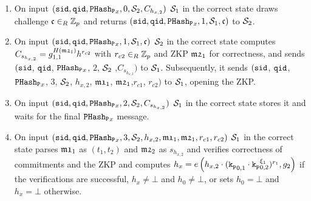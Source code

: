 \begin{enumerate}
    
	    \item On input $(\mathtt{sid},\mathtt{qid},\mathtt{PHash_P}_x,0,\mathcal{S}_2,C_{h_{x,2}})$ $\mathcal{S}_1$ in the correct state draws challenge $\mathfrak{c}\in_R\mathbb{Z}_p$ and returns $(\mathtt{sid},\mathtt{qid},\mathtt{PHash_P}_x,1,\mathcal{S}_1,\mathfrak{c})$ to $\mathcal{S}_2$.
	    
	    \item On input $(\mathtt{sid},\mathtt{qid},\mathtt{PHash_P}_x,1,\mathcal{S}_1,\mathfrak{c})$ $\mathcal{S}_2$ in the correct state computes
	    $C_{s_{h_{x,2}}}=g_{1,1}^{H(\mathfrak{m2}_{1})} h^{r_{c2}}$ with $r_{c2}\in_R\mathbb{Z}_p$ and \ac{ZKP} $\mathfrak{m2}_1$ for correctness,
	    and sends $(\mathtt{sid}$, $\mathtt{qid}$, $\mathtt{PHash_P}_x$, $2$, $\mathcal{S}_2$ ,$C_{s_{h_{x,2}}})$ to $\mathcal{S}_1$.
	    Subsequently, it sends $(\mathtt{sid}$, $\mathtt{qid}$, $\mathtt{PHash_P}_x$, $3$, $\mathcal{S}_2$, $h_{x,2}$, $\mathfrak{m1}_1$, $\mathfrak{m2}_1$,$ r_{c1}$, $r_{c2})$ to $\mathcal{S}_1$, opening the \ac{ZKP}.
	    
	    \item On input $(\mathtt{sid},\mathtt{qid},\mathtt{PHash_P}_x,2,\mathcal{S}_2,C_{s_{h_{x,2}}})$ $\mathcal{S}_1$ in the correct state stores it and waits for the final $\mathtt{PHash_P}_x$ message.
	    
	    \item On input $(\mathtt{sid},\mathtt{qid},\mathtt{PHash_P}_x,3,\mathcal{S}_2,h_{x,2}, \mathfrak{m1}_1, \mathfrak{m2}_1, r_{c1}, r_{c2})$ $\mathcal{S}_1$ in the correct state parses $\mathfrak{m1}_1$ as $(t_1,t_2)$ and $\mathfrak{m2}_2$ as $s_{h_{x,2}}$ and verifies correctness of commitments and the \ac{ZKP}
	     and computes
 	    $h_x = e\left( h_{x,2}\cdot (\mathtt{k_p}_{0,1} \cdot \mathtt{k_p}_{0,2}^{\xi_1})^{r_1}, g_2 \right)$
 	    if the verifications are successful, $h_x\not=\bot$ and $h_0\not=\bot$, or sets $h_0=\bot$ and $h_x=\bot$ otherwise.
	    
	    

\end{enumerate}

